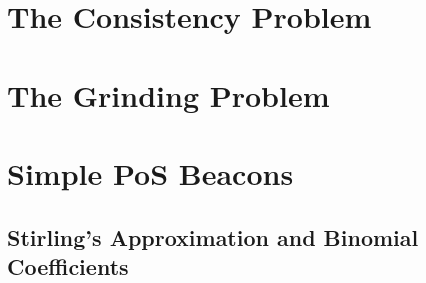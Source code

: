 \documentclass[11pt,oneside]{book}
\begin{document}

\singlespacing

\setcounter{tocdepth}{1}
\tableofcontents

\listoffigures

\listoftables

\thispagestyle{plain}
\mainmatter
\singlespacing



% 

\part{The Consistency Problem}


\part{The Grinding Problem}


\part{Simple PoS Beacons}




\singlespacing
\newpage
{}
  


\appendix
{}

\chapter{Stirling's Approximation and Binomial Coefficients}\label{app:binomial-coeff}


% 

% 
\end{document}
